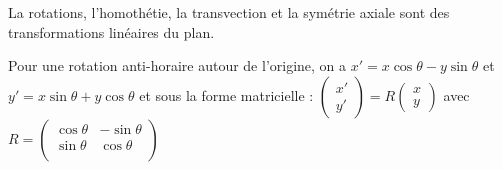 \documentclass{book}
\begin{document}
\begin{Exemple}
La rotations, l'homothétie, la transvection et la   symétrie axiale sont des transformations linéaires du plan. 
\begin{center}
\begin{Figure}

\begin{Titre}
Pour une rotation anti-horaire autour de l'origine, on a  $x '= x \cos \theta -y \sin \theta$ et $y ' = x \sin \theta + y \cos \theta$ et sous la forme matricielle : $\begin{pmatrix} x '\\ y' \end{pmatrix} = R \begin{pmatrix} x \\ y \end{pmatrix}$ avec $R=\begin{pmatrix}
\cos \theta & -\sin \theta\\
\sin \theta & \cos \theta\\
\end{pmatrix}$
\end{Titre}
\end{Figure}
\end{center}
\end{Exemple}
\end{document}
